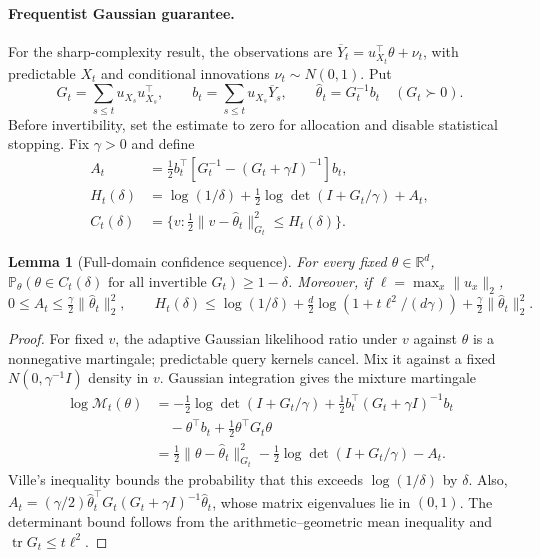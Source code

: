 \documentclass{article}
\theoremstyle{plain}
\newtheorem{lemma}[theorem]{Lemma}
\theoremstyle{definition}
\begin{document}
\paragraph{Frequentist Gaussian guarantee.}
For the sharp-complexity result, the observations are
$\overline Y_t=u_{X_t}^\top\theta+\nu_t$, with predictable $X_t$ and
conditional innovations $\nu_t\sim N(0,1)$.  Put
\[
 G_t=\sum_{s\le t}u_{X_s}u_{X_s}^\top,\qquad
 b_t=\sum_{s\le t}u_{X_s}\overline Y_s,\qquad
 \widehat\theta_t=G_t^{-1}b_t\quad(G_t\succ0).
\]
Before invertibility, set the estimate to zero for allocation and disable
statistical stopping.  Fix $\gamma>0$ and define
\begin{align}
 A_t&=\tfrac12b_t^\top[G_t^{-1}-(G_t+\gamma I)^{-1}]b_t,\nonumber\\
 H_t(\delta)&=\log(1/\delta)+\tfrac12\log\det(I+G_t/\gamma)+A_t,\nonumber\\
 C_t(\delta)&=\{v:\tfrac12\|v-\widehat\theta_t\|_{G_t}^2
                                      \le H_t(\delta)\}.
 \label{eq:bay-gaussian-cs}
\end{align}

\begin{lemma}[Full-domain confidence sequence]
\label{lem:bay-cs}
For every fixed $\theta\in\mathbb R^d$,
$\mathbb P_\theta(\theta\in C_t(\delta)\text{ for all invertible }G_t)
\ge1-\delta$.  Moreover, if $\ell=\max_x\|u_x\|_2$,
\[
 0\le A_t\le\tfrac\gamma2\|\widehat\theta_t\|_2^2,\qquad
 H_t(\delta)\le\log(1/\delta)
  +\tfrac d2\log(1+t\ell^2/(d\gamma))
  +\tfrac\gamma2\|\widehat\theta_t\|_2^2.
\]
\end{lemma}
\begin{proof}
For fixed $v$, the adaptive Gaussian likelihood ratio under $v$ against
$\theta$ is a nonnegative martingale; predictable query kernels cancel.
Mix it against a fixed $N(0,\gamma^{-1}I)$ density in $v$.
Gaussian integration gives the mixture martingale
\[
\begin{aligned}
\log\mathcal M_t(\theta)
&=-\tfrac12\log\det(I+G_t/\gamma)
  +\tfrac12b_t^\top(G_t+\gamma I)^{-1}b_t\\
&\quad-\theta^\top b_t+\tfrac12\theta^\top G_t\theta\\
&=\tfrac12\|\theta-\widehat\theta_t\|_{G_t}^2
 -\tfrac12\log\det(I+G_t/\gamma)-A_t.
\end{aligned}
\]
Ville's inequality bounds the probability that this exceeds
$\log(1/\delta)$ by $\delta$.  Also,
$A_t=(\gamma/2)\widehat\theta_t^\top
G_t(G_t+\gamma I)^{-1}\widehat\theta_t$, whose matrix eigenvalues lie
in $(0,1)$.  The determinant bound follows from the arithmetic--geometric
mean inequality and $\operatorname{tr}G_t\le t\ell^2$.
\end{proof}
\end{document}
